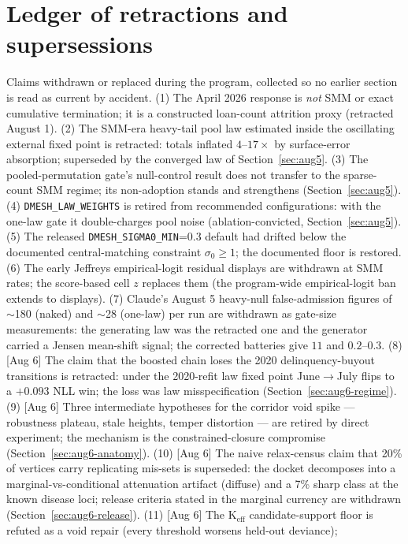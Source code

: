 \documentclass[11pt]{article}
\begin{document}
\section*{Ledger of retractions and supersessions}
Claims withdrawn or replaced during the program, collected so no earlier section is read
as current by accident. (1) The April 2026 response is \emph{not} SMM or exact cumulative
termination; it is a constructed loan-count attrition proxy (retracted August 1). (2) The
SMM-era heavy-tail pool law estimated inside the oscillating external fixed point is
retracted: totals inflated $4$--$17\times$ by surface-error absorption; superseded by the
converged law of Section~\ref{sec:aug5}. (3) The pooled-permutation gate's null-control
result does not transfer to the sparse-count SMM regime; its non-adoption stands and
strengthens (Section~\ref{sec:aug5}). (4) \texttt{DMESH\_LAW\_WEIGHTS} is retired from
recommended configurations: with the one-law gate it double-charges pool noise
(ablation-convicted, Section~\ref{sec:aug5}). (5) The released
\texttt{DMESH\_SIGMA0\_MIN}=0.3 default had drifted below the documented central-matching
constraint $\sigma_0\ge 1$; the documented floor is restored. (6) The early Jeffreys
empirical-logit residual displays are withdrawn at SMM rates; the score-based cell $z$
replaces them (the program-wide empirical-logit ban extends to displays). (7) Claude's
August 5 heavy-null false-admission figures of $\sim$180 (naked) and $\sim$28 (one-law)
per run are withdrawn as gate-size measurements: the generating law was the retracted one
and the generator carried a Jensen mean-shift signal; the corrected batteries give
$11$ and $0.2$--$0.3$. (8) [Aug 6] The claim that the boosted chain loses the 2020
delinquency-buyout transitions is retracted: under the 2020-refit law fixed point
June$\to$July flips to a $+0.093$ NLL win; the loss was law misspecification
(Section~\ref{sec:aug6-regime}). (9) [Aug 6] Three intermediate hypotheses for the
corridor void spike --- robustness plateau, stale heights, temper distortion --- are
retired by direct experiment; the mechanism is the constrained-closure compromise
(Section~\ref{sec:aug6-anatomy}). (10) [Aug 6] The naive relax-census claim that 20\%
of vertices carry replicating mis-sets is superseded: the docket decomposes into a
marginal-vs-conditional attenuation artifact (diffuse) and a 7\% sharp class at the
known disease loci; release criteria stated in the marginal currency are withdrawn
(Section~\ref{sec:aug6-release}). (11) [Aug 6] The K$_{\mathrm{eff}}$ candidate-support
floor is refuted as a void repair (every threshold worsens held-out deviance);
\end{document}
